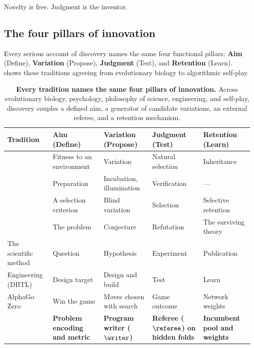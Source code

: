 \begin{keyidea}
Novelty is free. Judgment is the inventor.
\end{keyidea}

\subsection{The four pillars of innovation}\label{sub:anatomy-pillars}

Every serious account of discovery names the same four functional pillars: \textbf{Aim} (Define), \textbf{Variation} (Propose), \textbf{Judgment} (Test), and \textbf{Retention} (Learn).  shows these traditions agreeing from evolutionary biology to algorithmic self-play.

\begin{table}[t]
  \caption{\textbf{Every tradition names the same four pillars of innovation.} Across evolutionary biology, psychology, philosophy of science, engineering, and self-play, discovery couples a defined aim, a generator of candidate variations, an external referee, and a retention mechanism.}
  \label{tab:traditions}
  \centering
  \small
  \begin{tabular}{@{}l l l l l@{}}
    \toprule
    Tradition & Aim (Define) & Variation (Propose) & Judgment (Test) & Retention (Learn) \\
    \midrule
    \citet{darwin1859origin} & Fitness to an environment & Variation & Natural selection & Inheritance \\
    \citet{wallas1926art} & Preparation & Incubation, illumination & Verification & --- \\
    \citet{campbell1960bvsr} & A selection criterion & Blind variation & Selection & Selective retention \\
    \citet{popper1963conjectures} & The problem & Conjecture & Refutation & The surviving theory \\
    The scientific method & Question & Hypothesis & Experiment & Publication \\
    Engineering (DBTL) & Design target & Design and build & Test & Learn \\
    AlphaGo Zero \citep{silver2017mastering} & Win the game & Moves chosen with search & Game outcome & Network weights \\
    \textbf{\EZ{}} & \textbf{Problem encoding and metric} & \textbf{Program writer ($\writer$)} & \textbf{Referee ($\referee$) on hidden folds} & \textbf{Incumbent pool and weights} \\
    \bottomrule
  \end{tabular}
\end{table}

